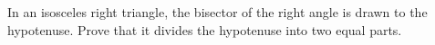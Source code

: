 In an isosceles right triangle, the bisector of the right angle is drawn to the hypotenuse. Prove that it divides the hypotenuse into two equal parts.
